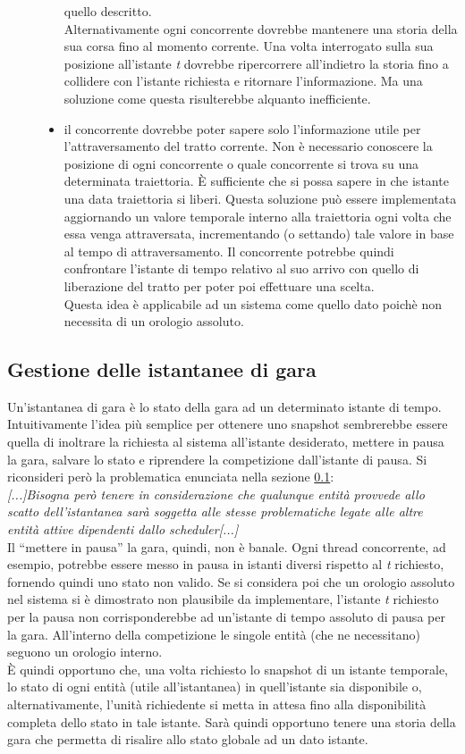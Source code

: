 \begin{description}
\begin{itemize}
quello descritto.\\
Alternativamente ogni concorrente dovrebbe mantenere una storia della sua corsa fino al momento corrente. Una volta interrogato
sulla sua posizione all'istante \emph{t} dovrebbe ripercorrere all'indietro la storia fino a collidere con l'istante richiesta
e ritornare l'informazione. Ma una soluzione come questa risulterebbe alquanto inefficiente.
\item il concorrente dovrebbe poter sapere solo l'informazione utile per l'attraversamento del tratto corrente. Non è necessario
conoscere la posizione di ogni concorrente o quale concorrente si trova su una determinata traiettoria. \`{E} sufficiente che
si possa sapere in che istante una data traiettoria si liberi. Questa soluzione può essere implementata aggiornando un valore
temporale interno alla traiettoria ogni volta che essa venga attraversata, incrementando (o settando) tale valore in base al 
tempo di attraversamento. Il concorrente potrebbe quindi confrontare l'istante di tempo relativo
al suo arrivo con quello di liberazione del tratto per poter poi effettuare una scelta.\\
Questa idea è applicabile ad un sistema come quello dato poichè non necessita di un orologio assoluto.
\end{itemize}
\end{description}
\subsection{Gestione delle istantanee di gara}
\label{enunciazione_istantanee}
Un'istantanea di gara è lo stato della gara ad un determinato istante di tempo. Intuitivamente l'idea più semplice per ottenere
uno snapshot sembrerebbe essere quella di inoltrare la richiesta al sistema all'istante desiderato, mettere in pausa la gara, 
salvare lo stato e riprendere la competizione dall'istante di pausa. Si riconsideri però la problematica enunciata nella
sezione \ref{enunciazione_istantanee}:\\
\emph{[...]Bisogna però tenere in considerazione che qualunque entità provvede allo scatto
dell'istantanea sarà soggetta alle stesse problematiche legate alle altre entità attive dipendenti dallo scheduler[...]}\\
Il ``mettere in pausa'' la gara, quindi, non è banale. Ogni thread concorrente, ad esempio, potrebbe essere messo in pausa
in istanti diversi rispetto al \emph{t} richiesto, fornendo quindi uno stato non valido. Se si considera poi che un orologio
assoluto nel sistema si è dimostrato non plausibile da implementare, l'istante \emph{t} richiesto per la pausa non corrisponderebbe ad un'istante
di tempo assoluto di pausa per la gara. All'interno della competizione le singole entità (che ne necessitano) seguono un orologio interno.\\
\`{E} quindi opportuno che, una volta richiesto lo snapshot di un istante temporale, lo stato di ogni entità (utile all'istantanea) in 
quell'istante sia disponibile o, alternativamente, l'unità richiedente si metta in attesa fino alla disponibilità completa dello stato
in tale istante. Sarà quindi opportuno tenere una storia della gara che permetta di risalire allo stato globale ad un dato istante.
